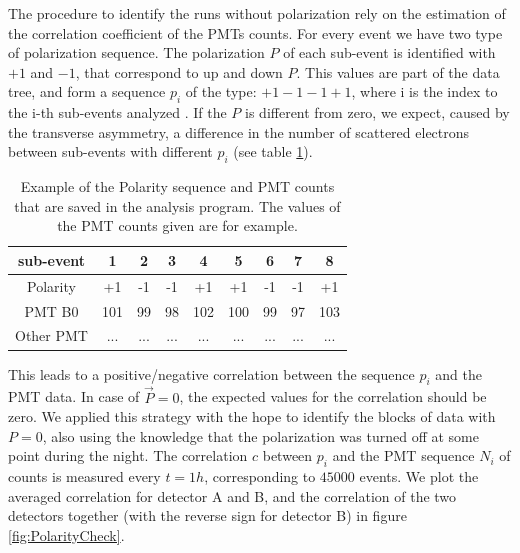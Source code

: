 The procedure to identify the runs without polarization rely on the estimation of the correlation coefficient of the PMTs counts. For every event we have two type of polarization sequence. The polarization $P$ of each sub-event is identified with $+1$ and $-1$, that correspond to up and down $P$. This values are part of the data tree, and form a sequence $p_{i}$ of the type: $+1-1-1+1$, where i is the index to the i-th sub-events analyzed . If the $P$ is different from zero, we expect, caused by the transverse asymmetry, a difference in the number of scattered electrons between sub-events with different $p_{i}$ (see table \ref{tab:PolarizationSequence}).

\begin{table}[hbtp]
\centering
\begin{tabular}{c|c|c|c|c|c|c|c|c}
\hline 
sub-event & 1 & 2 & 3 & 4 & 5 & 6 & 7 & 8 \\ 
\hline 
Polarity & +1 & -1 & -1 & +1 & +1 & -1 & -1 & +1 \\ 
PMT B0 & 101 & 99 & 98 & 102 & 100 & 99 & 97 & 103 \\ 
Other PMT & ... & ... & ... & ... & ... & ... & ... & ... \\ 
\hline
\end{tabular}
\caption{Example of the Polarity sequence and PMT counts that are saved in the analysis program. The values of the PMT counts given are for example.}
\label{tab:PolarizationSequence}
\end{table}

This leads to a positive/negative correlation between the sequence $p_{i}$ and the PMT data. In case of $\vec{P} = 0$, the expected values for the correlation should be zero.
We applied this strategy with the hope to identify the blocks of data with $P = 0$, also using the knowledge that the polarization was turned off at some point during the night. The correlation $c$ between $p_{i}$ and the PMT sequence $N_{i}$ of counts is measured every $t = 1 h$, corresponding to $45000$ events. We plot the averaged correlation for detector A and B, and the correlation of the two detectors together (with the reverse sign for detector B) in figure \ref{fig:PolarityCheck}.

